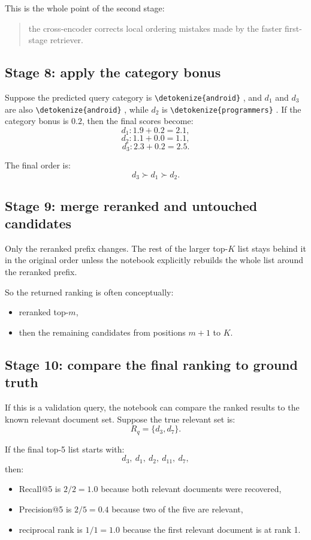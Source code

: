 \documentclass[10pt]{article}
\DeclareRobustCommand{\code}[1]{%
  \ifmmode
    \text{\nolinkurl{\detokenize{#1}}}%
  \else
    \nolinkurl{\detokenize{#1}}%
  \fi
}
\begin{document}
This is the whole point of the second stage:
\begin{quote}
the cross-encoder corrects local ordering mistakes made by the faster first-stage retriever.
\end{quote}

\subsection*{Stage 8: apply the category bonus}

Suppose the predicted query category is \code{android}, and \(d_1\) and \(d_3\) are also \code{android}, while \(d_2\) is \code{programmers}. If the category bonus is \(0.2\), then the final scores become:
\[
d_1: 1.9 + 0.2 = 2.1,
\]
\[
d_2: 1.1 + 0.0 = 1.1,
\]
\[
d_3: 2.3 + 0.2 = 2.5.
\]

The final order is:
\[
d_3 \succ d_1 \succ d_2.
\]

\subsection*{Stage 9: merge reranked and untouched candidates}

Only the reranked prefix changes. The rest of the larger top-\(K\) list stays behind it in the original order unless the notebook explicitly rebuilds the whole list around the reranked prefix.

So the returned ranking is often conceptually:
\begin{itemize}
    \item reranked top-\(m\),
    \item then the remaining candidates from positions \(m+1\) to \(K\).
\end{itemize}

\subsection*{Stage 10: compare the final ranking to ground truth}

If this is a validation query, the notebook can compare the ranked results to the known relevant document set. Suppose the true relevant set is:
\[
R_q = \{d_3, d_7\}.
\]

If the final top-5 list starts with:
\[
d_3,\ d_1,\ d_2,\ d_{11},\ d_7,
\]
then:
\begin{itemize}
    \item Recall@5 is \(2/2=1.0\) because both relevant documents were recovered,
    \item Precision@5 is \(2/5=0.4\) because two of the five are relevant,
    \item reciprocal rank is \(1/1=1.0\) because the first relevant document is at rank 1.
\end{itemize}
\end{document}
